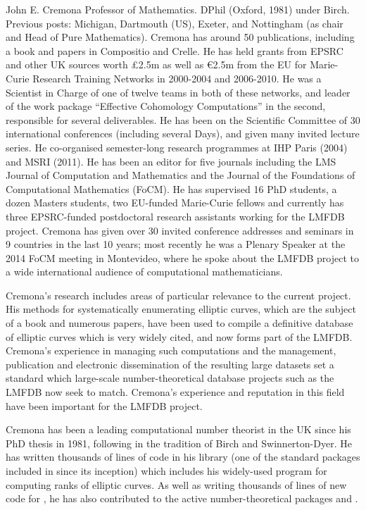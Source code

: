 \begin{participant}[type=leadPI,PM=3,gender=male]{John E. Cremona}
  Professor of Mathematics.  DPhil (Oxford, 1981) under Birch.
  Previous posts: Michigan, Dartmouth (US), Exeter, and Nottingham (as
  chair and Head of Pure Mathematics). Cremona has around 50
  publications, including a book and papers in Compositio and Crelle.
  He has held grants from EPSRC and other UK sources worth \pounds2.5m
  as well as \euro2.5m from the EU for Marie-Curie Research Training
  Networks in 2000-2004 and 2006-2010.  He was a Scientist in Charge
  of one of twelve teams in both of these networks, and leader of the
  work package ``Effective Cohomology Computations'' in the second,
  responsible for several deliverables.  He has been on the Scientific
  Committee of 30 international conferences (including several \Sage
  Days), and given many invited lecture series.  He co-organised
  semester-long research programmes at IHP Paris (2004) and MSRI
  (2011).  He has been an editor for five journals including the LMS
  Journal of Computation and Mathematics and the Journal of the
  Foundations of Computational Mathematics (FoCM).  He has supervised
  16 PhD students, a dozen Masters students, two EU-funded Marie-Curie
  fellows and currently has three EPSRC-funded postdoctoral research
  assistants working for the LMFDB project.  Cremona has given over 30
  invited conference addresses and seminars in 9 countries in the last
  10 years; most recently he was a Plenary Speaker at the 2014 FoCM
  meeting in Montevideo, where he spoke about the LMFDB project to a
  wide international audience of computational mathematicians.

  Cremona's research includes areas of particular relevance to the
  current project.  His methods for systematically enumerating
  elliptic curves, which are the subject of a book and numerous
  papers, have been used to compile a definitive database of elliptic
  curves which is very widely cited, and now forms part of the LMFDB.
  Cremona's experience in managing such computations and the
  management, publication and electronic dissemination of the
  resulting large datasets set a standard which large-scale
  number-theoretical database projects such as the LMFDB now seek to
  match.  Cremona's experience and reputation in this field have been
  important for the LMFDB project.

  Cremona has been a leading computational number theorist in the UK
  since his PhD thesis in 1981, following in the tradition of Birch
  and Swinnerton-Dyer.  He has written thousands of lines of code in
  his  library  (one of the standard packages included in \Sage
  since its inception) which includes his widely-used program
     for computing ranks of elliptic curves.  As well as
  writing thousands of lines of new \Python code for \Sage, he has also
  contributed to the active number-theoretical packages \PariGP and
  \Magma.
\end{participant}
